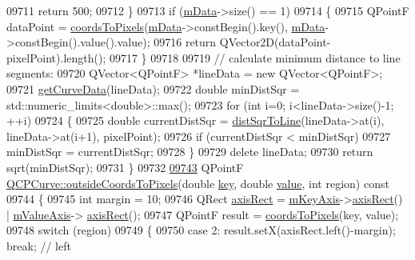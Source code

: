\begin{DoxyCode}
09711     \textcolor{keywordflow}{return} 500;
09712   \}
09713   \textcolor{keywordflow}{if} (\hyperlink{a00028_a88d533e455bca96004b049e99168731b}{mData}->size() == 1)
09714   \{
09715     QPointF dataPoint = \hyperlink{a00024_ade710a776104b14c1c835168ce1bfc5c}{coordsToPixels}(\hyperlink{a00028_a88d533e455bca96004b049e99168731b}{mData}->constBegin().key(), 
      \hyperlink{a00028_a88d533e455bca96004b049e99168731b}{mData}->constBegin().value().value);
09716     \textcolor{keywordflow}{return} QVector2D(dataPoint-pixelPoint).length();
09717   \}
09718   
09719   \textcolor{comment}{// calculate minimum distance to line segments:}
09720   QVector<QPointF> *lineData = \textcolor{keyword}{new} QVector<QPointF>;
09721   \hyperlink{a00028_afa895f8ba9ae34fea6ecea295fd7b1e5}{getCurveData}(lineData);
09722   \textcolor{keywordtype}{double} minDistSqr = std::numeric\_limits<double>::max();
09723   \textcolor{keywordflow}{for} (\textcolor{keywordtype}{int} i=0; i<lineData->size()-1; ++i)
09724   \{
09725     \textcolor{keywordtype}{double} currentDistSqr = \hyperlink{a00024_a5ea1cab44ca912dcdc96ed81ec5bed5d}{distSqrToLine}(lineData->at(i), lineData->at(i+1), pixelPoint);
09726     \textcolor{keywordflow}{if} (currentDistSqr < minDistSqr)
09727       minDistSqr = currentDistSqr;
09728   \}
09729   \textcolor{keyword}{delete} lineData;
09730   \textcolor{keywordflow}{return} sqrt(minDistSqr);
09731 \}
09732 
\hypertarget{a00115_source_l09743}{}\hyperlink{a00028_aec2099a1569775209f73bbb0d3da7c16}{09743} QPointF \hyperlink{a00028_aec2099a1569775209f73bbb0d3da7c16}{QCPCurve::outsideCoordsToPixels}(\textcolor{keywordtype}{double} 
      \hyperlink{a00116_a94bb892c30911cd62cba0707a5395be4}{key}, \textcolor{keywordtype}{double} \hyperlink{a00116_aee90379adb0307effb138f4871edbc5c}{value}, \textcolor{keywordtype}{int} region)\textcolor{keyword}{ const}
09744 \textcolor{keyword}{}\{
09745   \textcolor{keywordtype}{int} margin = 10;
09746   QRect \hyperlink{a00116_ad1541f59ff23332e3245b74af2fd3833}{axisRect} = \hyperlink{a00024_a692421b963472fa6e16156a74ba96832}{mKeyAxis}->\hyperlink{a00025_a7fe5b84f4891838b63ed5181f5811dc5}{axisRect}() | \hyperlink{a00024_acfc46d619ab9598be33b64146da45822}{mValueAxis}->
      \hyperlink{a00025_a7fe5b84f4891838b63ed5181f5811dc5}{axisRect}();
09747   QPointF result = \hyperlink{a00024_ade710a776104b14c1c835168ce1bfc5c}{coordsToPixels}(key, value);
09748   \textcolor{keywordflow}{switch} (region)
09749   \{
09750     \textcolor{keywordflow}{case} 2: result.setX(axisRect.left()-margin); \textcolor{keywordflow}{break}; \textcolor{comment}{// left}

\end{DoxyCode}

